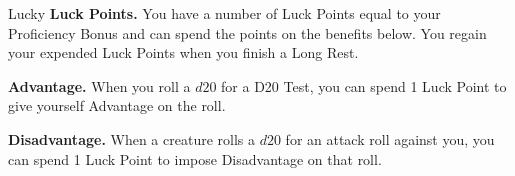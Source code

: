 \begin{Card}[Feat]{Lucky}
\textbf{Luck Points.} You have a number of Luck Points equal to your Proficiency Bonus and can spend the points on the benefits below. You regain your expended Luck Points when you finish a Long Rest.

\textbf{Advantage.} When you roll a $d20$ for a D20 Test, you can spend 1 Luck Point to give yourself Advantage on the roll.

\textbf{Disadvantage.} When a creature rolls a $d20$ for an attack roll against you, you can spend 1 Luck Point to impose Disadvantage on that roll.
\end{Card}


